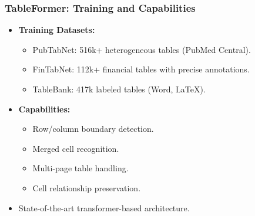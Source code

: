 \begin{frame}[fragile]\frametitle{TableFormer: Training and Capabilities}
      \begin{itemize}
        \item \textbf{Training Datasets:}
        \begin{itemize}
          \item PubTabNet: 516k+ heterogeneous tables (PubMed Central).
          \item FinTabNet: 112k+ financial tables with precise annotations.
          \item TableBank: 417k labeled tables (Word, LaTeX).
        \end{itemize}
        \item \textbf{Capabilities:}
        \begin{itemize}
          \item Row/column boundary detection.
          \item Merged cell recognition.
          \item Multi-page table handling.
          \item Cell relationship preservation.
        \end{itemize}
        \item State-of-the-art transformer-based architecture.
      \end{itemize}
\end{frame}

